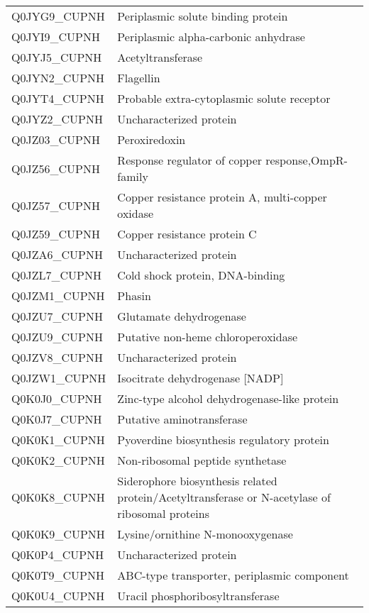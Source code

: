 \begin{center}
\begin{longtable}{ l l }
Q0JYG9\_CUPNH & Periplasmic solute binding protein \\ [0.5ex]
Q0JYI9\_CUPNH & Periplasmic alpha-carbonic anhydrase \\ [0.5ex]
Q0JYJ5\_CUPNH & Acetyltransferase \\ [0.5ex]
Q0JYN2\_CUPNH & Flagellin \\ [0.5ex]
Q0JYT4\_CUPNH & Probable extra-cytoplasmic solute receptor \\ [0.5ex]
Q0JYZ2\_CUPNH & Uncharacterized protein \\ [0.5ex]
Q0JZ03\_CUPNH & Peroxiredoxin \\ [0.5ex]
Q0JZ56\_CUPNH & Response regulator of copper response,OmpR-family \\ [0.5ex]
Q0JZ57\_CUPNH & Copper resistance protein A, multi-copper oxidase \\ [0.5ex]
Q0JZ59\_CUPNH & Copper resistance protein C \\ [0.5ex]
Q0JZA6\_CUPNH & Uncharacterized protein \\ [0.5ex]
Q0JZL7\_CUPNH & Cold shock protein, DNA-binding \\ [0.5ex]
Q0JZM1\_CUPNH & Phasin \\ [0.5ex]
Q0JZU7\_CUPNH & Glutamate dehydrogenase \\ [0.5ex]
Q0JZU9\_CUPNH & Putative non-heme chloroperoxidase \\ [0.5ex]
Q0JZV8\_CUPNH & Uncharacterized protein \\ [0.5ex]
Q0JZW1\_CUPNH & Isocitrate dehydrogenase [NADP] \\ [0.5ex]
Q0K0J0\_CUPNH & Zinc-type alcohol dehydrogenase-like protein \\ [0.5ex]
Q0K0J7\_CUPNH & Putative aminotransferase \\ [0.5ex]
Q0K0K1\_CUPNH & Pyoverdine biosynthesis regulatory protein \\ [0.5ex]
Q0K0K2\_CUPNH & Non-ribosomal peptide synthetase \\ [0.5ex]
Q0K0K8\_CUPNH & Siderophore biosynthesis related protein/Acetyltransferase or N-acetylase of ribosomal proteins \\ [0.5ex]
Q0K0K9\_CUPNH & Lysine/ornithine N-monooxygenase \\ [0.5ex]
Q0K0P4\_CUPNH & Uncharacterized protein \\ [0.5ex]
Q0K0T9\_CUPNH & ABC-type transporter, periplasmic component \\ [0.5ex]
Q0K0U4\_CUPNH & Uracil phosphoribosyltransferase \\ [0.5ex]

\end{longtable}
\end{center}
